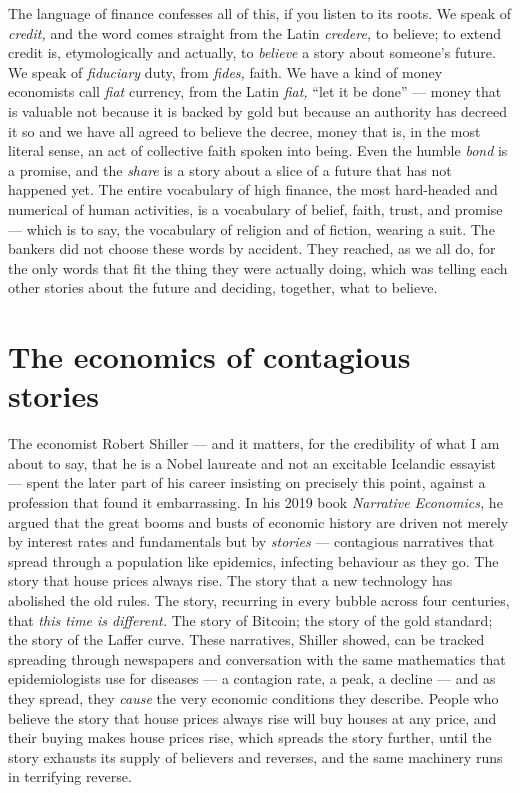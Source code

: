 The language of finance confesses all of this, if you listen to its roots. We speak of \emph{credit,} and the word comes straight from the Latin \emph{credere,} to believe; to extend credit is, etymologically and actually, to \emph{believe} a story about someone's future. We speak of \emph{fiduciary} duty, from \emph{fides,} faith. We have a kind of money economists call \emph{fiat} currency, from the Latin \emph{fiat,} ``let it be done'' — money that is valuable not because it is backed by gold but because an authority has decreed it so and we have all agreed to believe the decree, money that is, in the most literal sense, an act of collective faith spoken into being. Even the humble \emph{bond} is a promise, and the \emph{share} is a story about a slice of a future that has not happened yet. The entire vocabulary of high finance, the most hard-headed and numerical of human activities, is a vocabulary of belief, faith, trust, and promise — which is to say, the vocabulary of religion and of fiction, wearing a suit. The bankers did not choose these words by accident. They reached, as we all do, for the only words that fit the thing they were actually doing, which was telling each other stories about the future and deciding, together, what to believe.

\section*{The economics of contagious stories}

The economist Robert Shiller — and it matters, for the credibility of what I am about to say, that he is a Nobel laureate and not an excitable Icelandic essayist — spent the later part of his career insisting on precisely this point, against a profession that found it embarrassing. In his 2019 book \emph{Narrative Economics,} he argued that the great booms and busts of economic history are driven not merely by interest rates and fundamentals but by \emph{stories} — contagious narratives that spread through a population like epidemics, infecting behaviour as they go. The story that house prices always rise. The story that a new technology has abolished the old rules. The story, recurring in every bubble across four centuries, that \emph{this time is different.} The story of Bitcoin; the story of the gold standard; the story of the Laffer curve. These narratives, Shiller showed, can be tracked spreading through newspapers and conversation with the same mathematics that epidemiologists use for diseases — a contagion rate, a peak, a decline — and as they spread, they \emph{cause} the very economic conditions they describe. People who believe the story that house prices always rise will buy houses at any price, and their buying makes house prices rise, which spreads the story further, until the story exhausts its supply of believers and reverses, and the same machinery runs in terrifying reverse.

